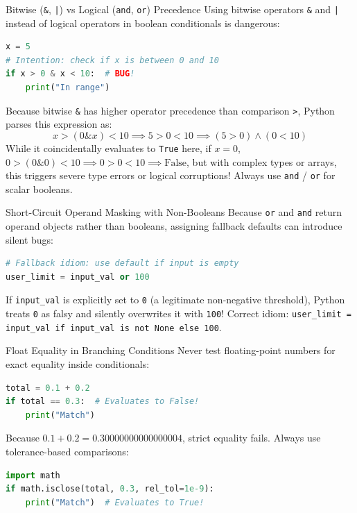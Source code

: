 \begin{trapbox}{Bitwise (\texttt{\&}, \texttt{|}) vs Logical (\texttt{and}, \texttt{or}) Precedence}
Using bitwise operators \texttt{\&} and \texttt{|} instead of logical operators in boolean conditionals is dangerous:
\begin{lstlisting}[language=Python]
x = 5
# Intention: check if x is between 0 and 10
if x > 0 & x < 10:  # BUG!
    print("In range")
\end{lstlisting}
Because bitwise \texttt{\&} has higher operator precedence than comparison \texttt{>}, Python parses this expression as:
\begin{equation*}
x > (0 \mathbin{\&} x) < 10 \implies 5 > 0 < 10 \implies (5 > 0) \land (0 < 10)
\end{equation*}
While it coincidentally evaluates to \texttt{True} here, if $x = 0$, $0 > (0 \& 0) < 10 \implies 0 > 0 < 10 \implies \text{False}$, but with complex types or arrays, this triggers severe type errors or logical corruptions! Always use \texttt{and} / \texttt{or} for scalar booleans.
\end{trapbox}

\begin{trapbox}{Short-Circuit Operand Masking with Non-Booleans}
Because \texttt{or} and \texttt{and} return operand objects rather than booleans, assigning fallback defaults can introduce silent bugs:
\begin{lstlisting}[language=Python]
# Fallback idiom: use default if input is empty
user_limit = input_val or 100
\end{lstlisting}
If \texttt{input\_val} is explicitly set to \texttt{0} (a legitimate non-negative threshold), Python treats \texttt{0} as falsy and silently overwrites it with \texttt{100}! Correct idiom: \texttt{user\_limit = input\_val if input\_val is not None else 100}.
\end{trapbox}

\begin{trapbox}{Float Equality in Branching Conditions}
Never test floating-point numbers for exact equality inside conditionals:
\begin{lstlisting}[language=Python]
total = 0.1 + 0.2
if total == 0.3:  # Evaluates to False!
    print("Match")
\end{lstlisting}
Because $0.1 + 0.2 = 0.30000000000000004$, strict equality fails. Always use tolerance-based comparisons:
\begin{lstlisting}[language=Python]
import math
if math.isclose(total, 0.3, rel_tol=1e-9):
    print("Match")  # Evaluates to True!
\end{lstlisting}
\end{trapbox}


